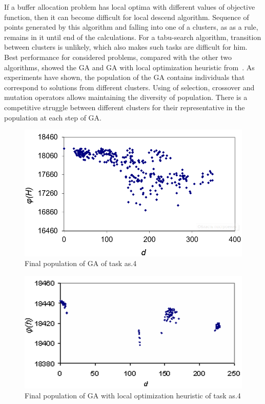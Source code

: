 \documentclass{ifacconf}
\begin{document}
If a buffer allocation problem has local
optima with different values of
objective 
function,
then it can become
difficult for local descend algorithm.
Sequence of points
generated by this algorithm and falling into one of a clusters, as
as a rule, remains in it until end of the calculations. For a tabu-search algorithm, transition between clusters is unlikely, which also makes
such tasks are difficult for him. Best performance for
considered problems, compared with the other two algorithms,
showed the GA and GA with local optimization heuristic from~\cite{sHBBA2007}. 
As experiments have shown, the population of the GA contains individuals that correspond to solutions from different clusters. 
Using of selection, crossover and mutation operators allows maintaining the diversity of population.
There is a competitive struggle between different clusters for their representative in the population at each step of GA.

 \begin{figure}[h!]
	\centering
	\includegraphics[scale=0.5]{ga_klaster}
  \caption{Final population of GA of task as.4} \label{fig:ga_klaster}
  \end{figure}
 \begin{figure}[h!]
	\centering
	\includegraphics[scale=0.5]{gals_klaster}
  \caption{Final population of GA with local optimization heuristic of task as.4} \label{fig:gals_klaster}
  \end{figure}
\end{document}
